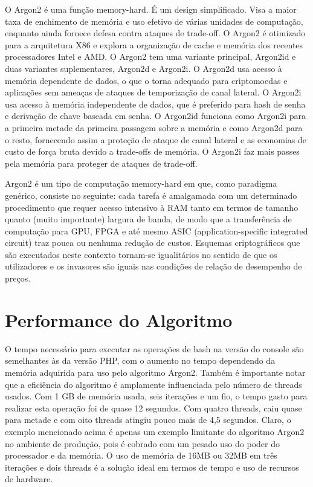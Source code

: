 \documentclass[conference]{IEEEtran}
\begin{document}
O Argon2 é uma função memory-hard. É um design simplificado. Visa a maior taxa de 
enchimento de memória e uso efetivo de várias unidades de computação, 
enquanto ainda fornece defesa contra ataques de trade-off. O Argon2 é otimizado 
para a arquitetura X86 e explora a organização de cache e memória dos recentes 
processadores Intel e AMD. O Argon2 tem uma variante principal, Argon2id e 
duas variantes suplementares, Argon2d e Argon2i. O Argon2d usa acesso à memória 
dependente de dados, o que o torna adequado para criptomoedas e aplicações sem ameaças 
de ataques de temporização de canal lateral. O Argon2i usa acesso à memória 
independente de dados, que é preferido para hash de senha e derivação de 
chave baseada em senha. O Argon2id funciona como Argon2i para a primeira metade 
da primeira passagem sobre a memória e como Argon2d para o resto, 
fornecendo assim a proteção de ataque de canal lateral e as economias de custo de 
força bruta devido a trade-offs de memória. O Argon2i faz mais passes pela memória 
para proteger de ataques de trade-off. \cite{rfc9106}

Argon2 é um tipo de computação memory-hard em que, como paradigma genérico, 
consiste no seguinte: cada tarefa é amalgamada com um determinado procedimento que 
requer acesso intensivo à RAM tanto em termos de tamanho quanto (muito importante) 
largura de banda, de modo que a transferência de computação para GPU, FPGA e até mesmo 
ASIC (application-specific integrated circuit) traz pouca ou nenhuma redução de custos. 
Esquemas criptográficos que são executados neste contexto tornam-se igualitários no 
sentido de que os utilizadores e os invasores são iguais nas condições de relação de 
desempenho de preços. \cite{biryukov2016egalitarian}

\section{Performance do Algoritmo}

O tempo necessário para executar as operações de hash na versão do console são 
semelhantes às da versão PHP, com o aumento no tempo dependendo da memória 
adquirida para uso pelo algoritmo Argon2. Também é importante notar que a eficiência 
do algoritmo é amplamente influenciada pelo número de threads usados. Com 1 GB de memória 
usada, seis iterações e um fio, o tempo gasto para realizar esta operação foi 
de quase 12 segundos. Com quatro threads, caiu quase para metade e com oito threads 
atingiu pouco mais de 4,5 segundos. Claro, o exemplo mencionado acima é apenas um exemplo 
limitante do algoritmo Argon2 no ambiente de produção, pois é cobrado com um pesado uso 
do poder do processador e da memória. O uso de memória de 16MB ou 32MB em três 
iterações e dois threads é a solução ideal em termos de tempo e uso de recursos 
de hardware. \cite{duka2020elliptic}
\end{document}
